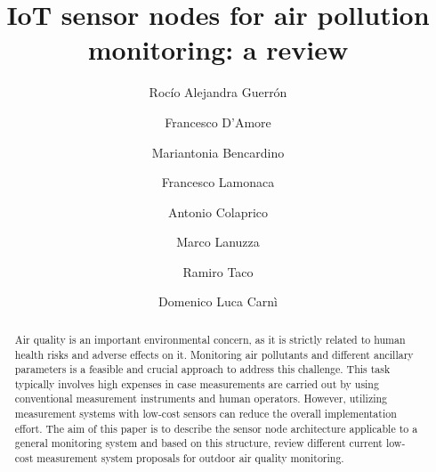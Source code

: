 \documentclass[10pt]{../imeko_acta}
\begin{document}
\title{IoT sensor nodes for air pollution monitoring: a review} %
\begin{abstract}
	Air quality is an important environmental concern, as it is strictly related to human health risks and adverse effects on it. Monitoring air pollutants and different ancillary parameters is a feasible and crucial approach to address this challenge. This task typically involves high expenses in case measurements are carried out by using conventional measurement instruments and human operators. However, utilizing measurement systems with low-cost sensors can reduce the overall implementation effort. The aim of this paper is to describe the sensor node architecture applicable to a general monitoring system and based on this structure, review different current low-cost measurement system proposals for outdoor air quality monitoring.
\end{abstract}


\author[1]{Rocío Alejandra Guerrón}
\author[2]{Francesco D'Amore}
\author[2]{Mariantonia Bencardino}
\author[1,3]{Francesco Lamonaca}
\author[4]{Antonio Colaprico}
\author[1]{Marco Lanuzza}
\author[1]{Ramiro Taco}
\author[1]{Domenico Luca Carnì}



\end{document}
